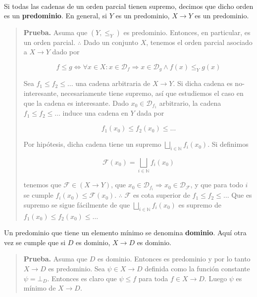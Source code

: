 \documentclass[article, 12pt]{article}
\begin{document}
~

Si todas las cadenas de un orden parcial tienen supremo, decimos que dicho orden
es un \textbf{predominio}. En general, si $Y$ es un predominio, $X \to Y$ es un
predominio.



\small
\begin{quote}

\textbf{Prueba.} Asuma que $\left( Y, \leq_Y \right) $ es predominio. Entonces,
en particular, es un orden parcial. $\therefore $ Dado un conjunto $X$, tenemos
el orden parcial asociado a $X \to Y$ dado por 

\begin{equation*}
  f \leq g \iff \forall x \in X : x \in \mathcal{D}_f \Rightarrow x \in \mathcal{D}_g \land f(x)
  \leq_Y g(x)
\end{equation*}

Sea $f_1 \leq f_2 \leq \ldots$ una cadena arbitraria de $X \to Y$. Si dicha
cadena es no-interesante, necesariamente tiene supremo, así que estudiemos el
caso en que la cadena es interesante. Dado $x_0 \in \mathcal{D}_{f_1}$ arbitrario, la cadena
$f_1 \leq f_2 \leq \ldots$ induce una cadena en $Y$ dada por 

\begin{equation*}
  f_1(x_0) \leq f_2(x_0) \leq \ldots
\end{equation*}

Por hipótesis, dicha cadena tiene un supremo $\bigsqcup_{i \in \mathbb{N}}
f_i(x_0)$. Si definimos 

$$\mathcal{F}(x_0) = \bigsqcup_{i \in \mathbb{N}} f_i(x_0)$$

tenemos que $\mathcal{F} \in (X \to Y)$, que $x_0 \in \mathcal{D}_{f_i}
\Rightarrow x_0\in \mathcal{D}_{\mathcal{F}}$, y que para todo $i$ se cumple
$f_i(x_0) \leq \mathcal{F}(x_0)$. $\therefore $ $\mathcal{F}$ es cota superior
de $f_1 \leq f_2 \leq \ldots$ Que es supremo se sigue fácilmente de que 
$\bigsqcup_{i \in \mathbb{N}} f_i(x_0)$ es supremo de $f_1(x_0) \leq f_2(x_0)
\leq \ldots$


\end{quote}
\normalsize

Un predominio que tiene un elemento mínimo se denomina \textbf{dominio}. Aquí
otra vez se cumple que si $D$ es dominio, $X \to D$ es dominio.

\small
\begin{quote}

\textbf{Prueba.} Asuma que $D$ es dominio. Entonces es predominio y por lo tanto
$X \to D$ es predominio. Sea $\psi \in X \to D$ definida como la función
constante $\psi = \bot_D$. Entonces es claro que $\psi \leq f$ para toda $f \in
X \to D$. Luego $\psi$ es mínimo de $X \to D$.


\end{quote}
\normalsize
\end{document}
